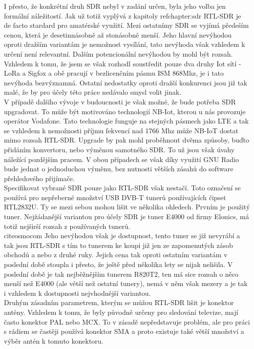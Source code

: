 \documentclass{ctuthesis}
\begin{document}
I přesto, že konkrétní druh SDR nebyl v zadání určen, byla jeho volba jen formální záležitostí. Jak už totiž vyplývá z kapitoly ref{chapter:sdr} RTL-SDR je de facto stardard pro amatérské využití. Mezi ostatnímy SDR se vyjímá předeším cenou, která je desetinnásobně až stonásobně menší. Jeho hlavní nevýhodou oproti dražším variantám je nemožnost vysílání, tato nevýhoda však vzhledem k určení není relevantní. Dalším potencionální nevýhodou by mohl být rozsah. Vzhledem k tomu, že jsem se však rozhodl soustředit pouze dva druhy Iot sítí - LoRa a Sigfox a obě pracují v bezlicenčním pásmu ISM 868Mhz, je i tato nevýhoda bezvýznamná. Ostatní nedostatky oproti dražší konkurenci jsou již tak malé, že by pro účely této práce nedávalo smysl volit jinak.\\
V případě dalšího vývoje v budoucnosti je však možné, že bude potřeba SDR upgradovat. To může být motivováno technologií NB-Iot, kterou u nás provozuje operátor Vodafone. Tato technologie funguje na stejných pásmech jako LTE a tak se vzhledem k nemožnosti příjmu fekvencí nad 1766 Mhz může NB-IoT dostat mimo rozsah RTL-SDR. Upgrade by pak mohl proběhnout dvěma způsoby, buďto přidáním konvertoru, nebo výměnou samotného SDR. To už jsou však úvahy náležící pozdějším pracem. V obou případech se však díky využití GNU Radio bude jednat o jednoduchou výměnu, bez nutnosti větších zásahů do software přehledového přijímače.\\
Specifikovat vybrané SDR pouze jako RTL-SDR však nestačí. Toto označení se používá pro nepřeberné množství USB DVB-T tunerů používajících čipset RTL2832U. Ty se mezi sebou mohou lišit ve několika ohledech. Prvním je použitý tuner. Nejžádanější variantou pro účely SDR je tuner E4000 od firmy Elonics, má totiž nejširší rozsah z používaných tunerů. \\cite{osmocom} Jeho nevýhodou však je dostupnost, tento tuner se již nevyrábí a tak jsou RTL-SDR s tím to tunerem ke koupi již jen ze zapomenutých zásob obchodů a nebo z druhé ruky. Jejich cena tak oproti ostatním variantám v poslední době stoupla i přesto, že ještě před několika lety se nijak nelišila. V poslední době je tak nejběžnějším tunerem R820T2, ten má sice rozsah o něco menší než E4000 (ale větší než ostatní tunery), nemá v něm však mezery a je tak i vzhledem k dostupnosti nejvhodnější variantou.\\
Druhým zásadním parametrem, kterým se můžou RTL-SDR lišit je konektor antény. Vzhledem k tomu, že byly původně určeny pro sledování televize, mají často konektor PAL nebo MCX. \cite{rtlsdrcom} To v zásadě nepředstavuje problém, ale pro práci s rádiem se častěji používá konektor SMA a proto existuje také větší množství a výběr antén k tomuto konektoru.\\
\end{document}
